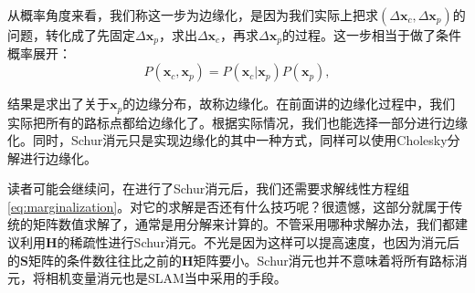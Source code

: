 从概率角度来看，我们称这一步为边缘化，是因为我们实际上把求$(\Delta \bm{x}_c, \Delta \bm{x}_p)$的问题，转化成了先固定$\Delta \bm{x}_p$，求出$\Delta \bm{x}_c$，再求$\Delta \bm{x}_p$的过程。这一步相当于做了条件概率展开：
\begin{equation}
P( \bm{x}_c, \bm{x}_p ) = P(\bm{x}_c | \bm{x}_p ) P( \bm{x}_p ) ,
\end{equation}

结果是求出了关于$\bm{x}_p$的边缘分布，故称边缘化。在前面讲的边缘化过程中，我们实际把所有的路标点都给边缘化了。根据实际情况，我们也能选择一部分进行边缘化。同时，Schur消元只是实现边缘化的其中一种方式，同样可以使用Cholesky分解进行边缘化。

读者可能会继续问，在进行了Schur消元后，我们还需要求解线性方程组\eqref{eq:marginalization}。对它的求解是否还有什么技巧呢？很遗憾，这部分就属于传统的矩阵数值求解了，通常是用分解来计算的。不管采用哪种求解办法，我们都建议利用$\bm{H}$的稀疏性进行Schur消元。不光是因为这样可以提高速度，也因为消元后的$\bm{S}$矩阵的条件数往往比之前的$\bm{H}$矩阵要小。Schur消元也并不意味着将所有路标消元，将相机变量消元也是SLAM当中采用的手段。


